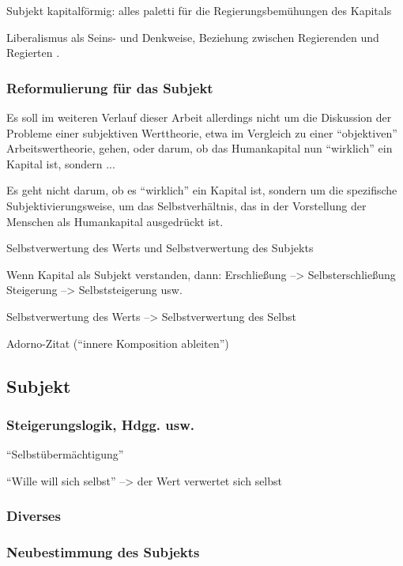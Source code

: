 \documentclass[12pt,
               DIV13,
               paper=a4,
               twoside=false,
               onehalfspacing,
               bibliography=totoc,
               toc=graduated,
               draft,
               ]{scrartcl}
\newcommand{\vgl}[2]{\parencite[vgl.][#1]{#2}}
\begin{document}
Subjekt kapitalförmig: alles paletti für die Regierungsbemühungen des
Kapitals

Liberalismus als Seins- und Denkweise, Beziehung zwischen Regierenden
und Regierten \vgl{305}{gbp}.

\newpage
\subsubsection{Reformulierung für das Subjekt}

Es soll im weiteren Verlauf dieser Arbeit allerdings nicht um die
Diskussion der Probleme einer subjektiven Werttheorie, etwa im
Vergleich zu einer "`objektiven"' Arbeitswertheorie, gehen, oder
darum, ob das Humankapital nun "`wirklich"' ein Kapital ist, sondern
...

Es geht nicht darum, ob es "`wirklich"' ein Kapital ist, sondern um
die spezifische Subjektivierungsweise, um das Selbstverhältnis, das in
der Vorstellung der Menschen als Humankapital ausgedrückt ist.

Selbstverwertung des Werts und Selbstverwertung des Subjekts

Wenn Kapital als Subjekt verstanden, dann:
Erschließung --> Selbsterschließung
Steigerung --> Selbststeigerung usw.

Selbstverwertung des Werts --> Selbstverwertung des Selbst

Adorno-Zitat ("`innere Komposition ableiten"')


\subsection{Subjekt}

\subsubsection{Steigerungslogik, Hdgg. usw.}

"`Selbstübermächtigung"'

"`Wille will sich selbst"' --> der Wert verwertet sich selbst

\subsubsection{Diverses}

\subsubsection{Neubestimmung des Subjekts}
\end{document}
